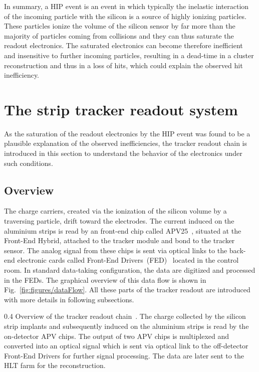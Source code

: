 In summary, a HIP event is an event in which typically the inelastic interaction of the incoming particle with the silicon is a source of highly ionizing particles. These particles ionize the volume of the silicon sensor by far more than the majority of particles coming from collisions and they can thus saturate the readout electronics. The saturated electronics can become therefore inefficient and insensitive to further incoming particles, resulting in a dead-time in a cluster reconstruction and thus in a loss of hits, which could explain the observed hit inefficiency.


\section{The strip tracker readout system}

As the saturation of the readout electronics by the HIP event was found to be a plausible explanation of the observed inefficiencies, the tracker readout chain is introduced in this section to understand the behavior of the electronics under such conditions.


\subsection{Overview}


The charge carriers, created via the ionization of the silicon volume by a traversing particle, drift toward the electrodes. The current induced on the aluminium strips is read by an front-end chip called APV25~\cite{French:2001xb}, situated at the Front-End Hybrid, attached to the tracker module and bond to the tracker sensor. The analog signal from these chips is sent via optical links to the back-end electronic cards called Front-End Drivers~(FED)~\cite{Baird:2002wg} located in the control room. In standard data-taking configuration, the data are digitized and processed in the FEDs. The graphical overview of this data flow is shown in Fig.~\ref{fig:figures/dataFlow}. All these parts of the tracker readout are introduced with more details in following subsections.

                 {0.4}       %
                 {Overview of the tracker readout chain~\cite{Bainbridge:2004jc}. The charge collected by the silicon strip implants and subsequently induced on the aluminium strips is read by the on-detector APV chips. The output of two APV chips is multiplexed and converted into an optical signal which is sent via optical link to the off-detector Front-End Drivers for further signal processing. The data are later sent to the HLT farm for the reconstruction. } %

